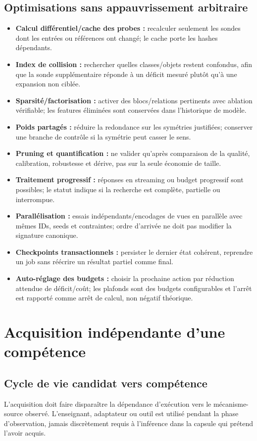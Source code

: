 \documentclass[11pt,a4paper]{report}
\begin{document}
\section{Optimisations sans appauvrissement arbitraire}
\begin{itemize}[leftmargin=1.5em]
\item \textbf{Calcul différentiel/cache des probes :} recalculer seulement les sondes dont les entrées ou références ont changé; le cache porte les hashes dépendants.
\item \textbf{Index de collision :} rechercher quelles classes/objets restent confondus, afin que la sonde supplémentaire réponde à un déficit mesuré plutôt qu'à une expansion non ciblée.
\item \textbf{Sparsité/factorisation :} activer des blocs/relations pertinents avec ablation vérifiable; les features éliminées sont conservées dans l'historique de modèle.
\item \textbf{Poids partagés :} réduire la redondance sur les symétries justifiées; conserver une branche de contrôle si la symétrie peut casser le sens.
\item \textbf{Pruning et quantification :} ne valider qu'après comparaison de la qualité, calibration, robustesse et dérive, pas sur la seule économie de taille.
\item \textbf{Traitement progressif :} réponses en streaming ou budget progressif sont possibles; le statut indique si la recherche est complète, partielle ou interrompue.
\item \textbf{Parallélisation :} essais indépendants/encodages de vues en parallèle avec mêmes IDs, seeds et contraintes; ordre d'arrivée ne doit pas modifier la signature canonique.
\item \textbf{Checkpoints transactionnels :} persister le dernier état cohérent, reprendre un job sans réécrire un résultat partiel comme final.
\item \textbf{Auto-réglage des budgets :} choisir la prochaine action par réduction attendue de déficit/coût; les plafonds sont des budgets configurables et l'arrêt est rapporté comme arrêt de calcul, non négatif théorique.
\end{itemize}

\chapter{Acquisition indépendante d'une compétence}
\section{Cycle de vie candidat vers compétence}
L'acquisition doit faire disparaître la dépendance d'exécution vers le mécanisme-source observé. L'enseignant, adaptateur ou outil est utilisé pendant la phase d'observation, jamais discrètement requis à l'inférence dans la capsule qui prétend l'avoir acquis.
\end{document}
